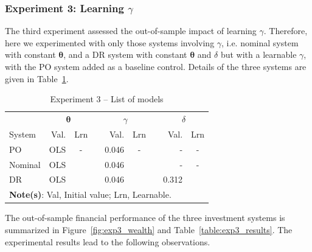 \documentclass[10pt, twocolumn]{article}
\newcommand{\cmark}{\ding{51}}%
\newcommand{\xmark}{\ding{55}}%
\theoremstyle{plain}
\theoremstyle{definition}
\begin{document}
\subsubsection{Experiment 3: Learning \texorpdfstring{\(\gamma\)}{Lg}}\label{sec:learn_gamma}
The third experiment assessed the out-of-sample impact of learning 
\(\gamma\). Therefore, here we experimented with only those systems
involving \(\gamma\), i.e.  nominal system with constant \(\bm{\theta}\), 
and a DR system with constant \(\bm{\theta}\) and \(\delta\) but with a learnable
\(\gamma\), with the PO system added as a baseline control. Details of the three
systems are given in Table~\ref{table:exp3_models}.

\begin{table}[t]
\caption{Experiment 3 -- List of models}
\centering
\begin{tabular}{lrcr@{}rcr@{}rc}
\toprule
		& \multicolumn{2}{c}{\(\bm{\theta}\)} & & \multicolumn{2}{c}{\(\gamma\)} & & \multicolumn{2}{c}{\(\delta\)}\\[0.5ex] \cline{2-3} \cline{5-6} \cline{8-9}
\rule{0pt}{3ex}System 	& Val. 	& Lrn    && Val. & Lrn 	  && Val. & Lrn \\ 
\midrule
PO 		& OLS 	& -      &&	0.046 & -      && -     & -      \\[0.5ex]
Nominal & OLS 	& \xmark &&	0.046 & \cmark && -     & -      \\[0.5ex]
DR		& OLS 	& \xmark &&	0.046 & \cmark && 0.312 & \xmark \\[0.25ex]
\bottomrule
\multicolumn{9}{p{0.9\linewidth}}{\small\rule{0pt}{3ex}\textbf{Note(s)}: Val, Initial value; Lrn, Learnable.}\\
\end{tabular}
\label{table:exp3_models}
\end{table}

The out-of-sample financial performance of the three investment systems is 
summarized in Figure~\ref{fig:exp3_wealth} and Table~\ref{table:exp3_results}. 
The experimental results lead to the following observations.
\end{document}
